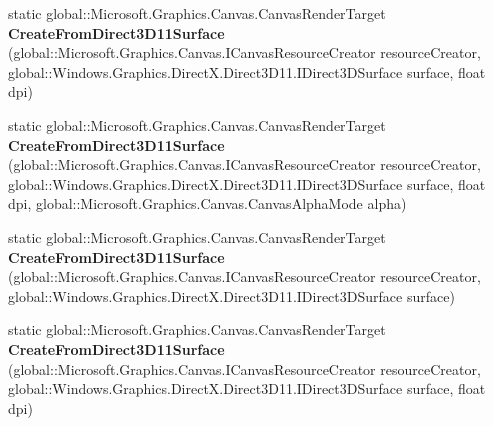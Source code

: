 \begin{DoxyCompactItemize}
\item 
\mbox{\label{class_microsoft_1_1_graphics_1_1_canvas_1_1_canvas_render_target_a3aab21df283c755cb1bc43211916da41}} 
static global\+::\+Microsoft.\+Graphics.\+Canvas.\+Canvas\+Render\+Target {\bfseries Create\+From\+Direct3\+D11\+Surface} (global\+::\+Microsoft.\+Graphics.\+Canvas.\+I\+Canvas\+Resource\+Creator resource\+Creator, global\+::\+Windows.\+Graphics.\+Direct\+X.\+Direct3\+D11.\+I\+Direct3\+D\+Surface surface, float dpi)
\item 
\mbox{\label{class_microsoft_1_1_graphics_1_1_canvas_1_1_canvas_render_target_aaa9628136a19a0737f5229fbb9c84e55}} 
static global\+::\+Microsoft.\+Graphics.\+Canvas.\+Canvas\+Render\+Target {\bfseries Create\+From\+Direct3\+D11\+Surface} (global\+::\+Microsoft.\+Graphics.\+Canvas.\+I\+Canvas\+Resource\+Creator resource\+Creator, global\+::\+Windows.\+Graphics.\+Direct\+X.\+Direct3\+D11.\+I\+Direct3\+D\+Surface surface, float dpi, global\+::\+Microsoft.\+Graphics.\+Canvas.\+Canvas\+Alpha\+Mode alpha)
\item 
\mbox{\label{class_microsoft_1_1_graphics_1_1_canvas_1_1_canvas_render_target_a6214c61bb128a65a41a783600e00335a}} 
static global\+::\+Microsoft.\+Graphics.\+Canvas.\+Canvas\+Render\+Target {\bfseries Create\+From\+Direct3\+D11\+Surface} (global\+::\+Microsoft.\+Graphics.\+Canvas.\+I\+Canvas\+Resource\+Creator resource\+Creator, global\+::\+Windows.\+Graphics.\+Direct\+X.\+Direct3\+D11.\+I\+Direct3\+D\+Surface surface)
\item 
\mbox{\label{class_microsoft_1_1_graphics_1_1_canvas_1_1_canvas_render_target_a3aab21df283c755cb1bc43211916da41}} 
static global\+::\+Microsoft.\+Graphics.\+Canvas.\+Canvas\+Render\+Target {\bfseries Create\+From\+Direct3\+D11\+Surface} (global\+::\+Microsoft.\+Graphics.\+Canvas.\+I\+Canvas\+Resource\+Creator resource\+Creator, global\+::\+Windows.\+Graphics.\+Direct\+X.\+Direct3\+D11.\+I\+Direct3\+D\+Surface surface, float dpi)
\item 
\mbox{\label{class_microsoft_1_1_graphics_1_1_canvas_1_1_canvas_render_target_aaa9628136a19a0737f5229fbb9c84e55}} 

\end{DoxyCompactItemize}
